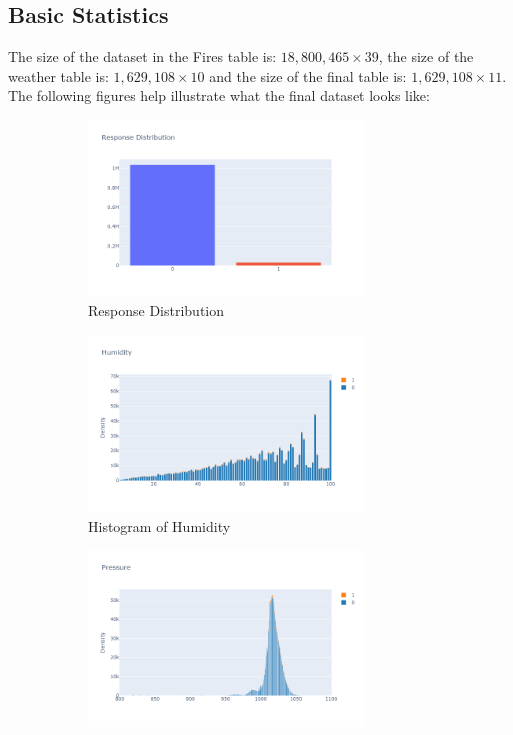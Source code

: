 \documentclass[10pt]{article}
\begin{document}
\subsection{Basic Statistics}
The size of the dataset in the Fires table is: $18,800,465\times 39$,
the size of the weather table is: $1,629,108\times 10$ and
the size of the final table is: $1,629,108\times 11$. The following
figures help illustrate what the final dataset looks like:\par
\begin{figure}[H]
    \centering
    \begin{subfigure}[t]{0.48\textwidth}
        \centering
        \includegraphics[width=0.8\textwidth]{../res/eda1.png}
        \caption{Response Distribution}
    \end{subfigure}
    \begin{subfigure}[t]{0.48\textwidth}
        \centering
        \includegraphics[width=0.8\textwidth]{../res/eda2.png}
        \caption{Histogram of Humidity}
    \end{subfigure}
    \begin{subfigure}[t]{0.48\textwidth}
        \centering
        \includegraphics[width=0.8\textwidth]{../res/eda3.png}

\end{subfigure}
\end{figure}
\end{document}
